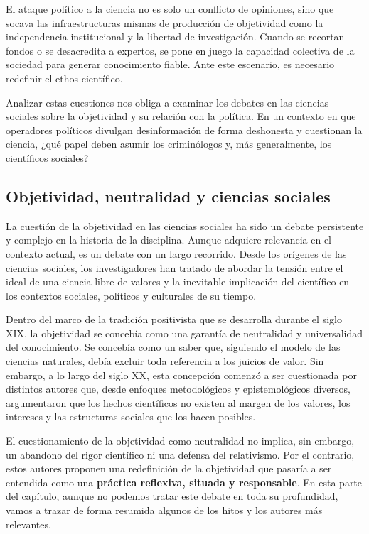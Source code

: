 \documentclass[
  spanish,
  letterpaper,
  DIV=11,
  numbers=noendperiod]{scrreprt}
\begin{document}
El ataque político a la ciencia no es solo un conflicto de opiniones,
sino que socava las infraestructuras mismas de producción de objetividad
como la independencia institucional y la libertad de investigación.
Cuando se recortan fondos o se desacredita a expertos, se pone en juego
la capacidad colectiva de la sociedad para generar conocimiento fiable.
Ante este escenario, es necesario redefinir el ethos científico.

Analizar estas cuestiones nos obliga a examinar los debates en las
ciencias sociales sobre la objetividad y su relación con la política. En
un contexto en que operadores políticos divulgan desinformación de forma
deshonesta y cuestionan la ciencia, ¿qué papel deben asumir los
criminólogos y, más generalmente, los científicos sociales?

\subsection{Objetividad, neutralidad y ciencias
sociales}\label{objetividad-neutralidad-y-ciencias-sociales}

La cuestión de la objetividad en las ciencias sociales ha sido un debate
persistente y complejo en la historia de la disciplina. Aunque adquiere
relevancia en el contexto actual, es un debate con un largo recorrido.
Desde los orígenes de las ciencias sociales, los investigadores han
tratado de abordar la tensión entre el ideal de una ciencia libre de
valores y la inevitable implicación del científico en los contextos
sociales, políticos y culturales de su tiempo.

Dentro del marco de la tradición positivista que se desarrolla durante
el siglo XIX, la objetividad se concebía como una garantía de
neutralidad y universalidad del conocimiento. Se concebía como un saber
que, siguiendo el modelo de las ciencias naturales, debía excluir toda
referencia a los juicios de valor. Sin embargo, a lo largo del siglo XX,
esta concepción comenzó a ser cuestionada por distintos autores que,
desde enfoques metodológicos y epistemológicos diversos, argumentaron
que los hechos científicos no existen al margen de los valores, los
intereses y las estructuras sociales que los hacen posibles.

El cuestionamiento de la objetividad como neutralidad no implica, sin
embargo, un abandono del rigor científico ni una defensa del
relativismo. Por el contrario, estos autores proponen una redefinición
de la objetividad que pasaría a ser entendida como una \textbf{práctica
reflexiva, situada y responsable}. En esta parte del capítulo, aunque no
podemos tratar este debate en toda su profundidad, vamos a trazar de
forma resumida algunos de los hitos y los autores más relevantes.
\end{document}
